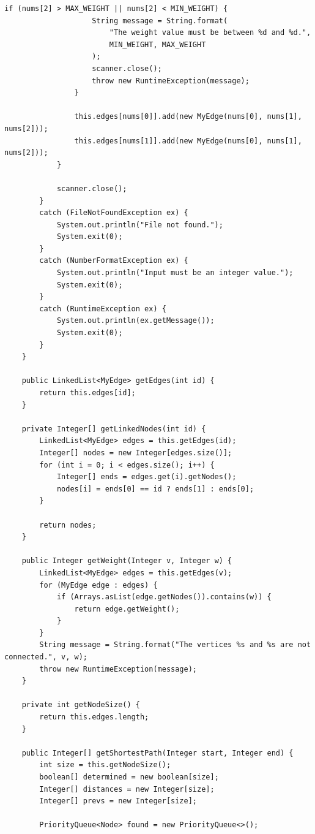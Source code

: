 \documentclass[a4j]{jarticle}
\begin{document}
\begin{lstlisting}[caption=MyGraph.java]
                if (nums[2] > MAX_WEIGHT || nums[2] < MIN_WEIGHT) {
                    String message = String.format(
                        "The weight value must be between %d and %d.",
                        MIN_WEIGHT, MAX_WEIGHT
                    );
                    scanner.close();
                    throw new RuntimeException(message);
                }

                this.edges[nums[0]].add(new MyEdge(nums[0], nums[1], nums[2]));
                this.edges[nums[1]].add(new MyEdge(nums[0], nums[1], nums[2]));
            }

            scanner.close();
        }
        catch (FileNotFoundException ex) {
            System.out.println("File not found.");
            System.exit(0);
        }
        catch (NumberFormatException ex) {
            System.out.println("Input must be an integer value.");
            System.exit(0);
        }
        catch (RuntimeException ex) {
            System.out.println(ex.getMessage());
            System.exit(0);
        }
    }

    public LinkedList<MyEdge> getEdges(int id) {
        return this.edges[id];
    }

    private Integer[] getLinkedNodes(int id) {
        LinkedList<MyEdge> edges = this.getEdges(id);
        Integer[] nodes = new Integer[edges.size()];
        for (int i = 0; i < edges.size(); i++) {
            Integer[] ends = edges.get(i).getNodes();
            nodes[i] = ends[0] == id ? ends[1] : ends[0];
        }

        return nodes;
    }

    public Integer getWeight(Integer v, Integer w) {
        LinkedList<MyEdge> edges = this.getEdges(v);
        for (MyEdge edge : edges) {
            if (Arrays.asList(edge.getNodes()).contains(w)) {
                return edge.getWeight();
            }
        }
        String message = String.format("The vertices %s and %s are not connected.", v, w);
        throw new RuntimeException(message);
    }

    private int getNodeSize() {
        return this.edges.length;
    }

    public Integer[] getShortestPath(Integer start, Integer end) {
        int size = this.getNodeSize();
        boolean[] determined = new boolean[size];
        Integer[] distances = new Integer[size];
        Integer[] prevs = new Integer[size];

        PriorityQueue<Node> found = new PriorityQueue<>();


\end{lstlisting}
\end{document}
